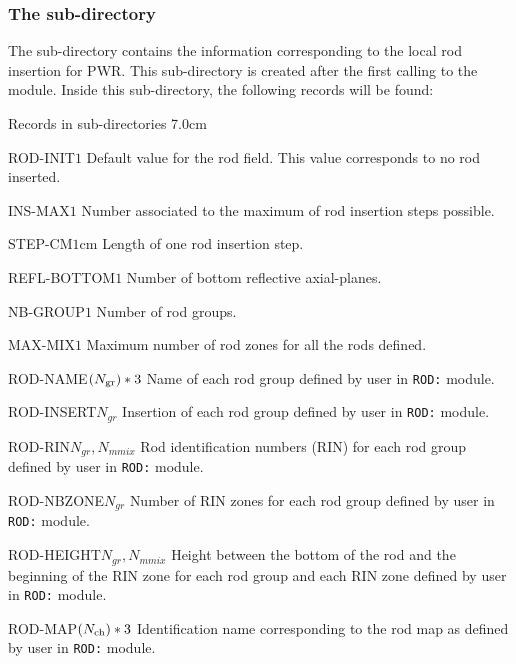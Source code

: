 \subsubsection{The  sub-directory}\label{sect:dirrodinfo}

The  sub-directory contains the information corresponding
to the local rod insertion for PWR. This sub-directory is created after the first calling to the  module. Inside this sub-directory,
the following records will be found:

\begin{DescriptionEnregistrement}{Records in  sub-directories}
{7.0cm} \label{tabl:tabrodinfo}

\RealEnr
 {ROD-INIT}{$1$}{} {Default value for the rod field. This value corresponds to no rod inserted.}

\IntEnr
 {INS-MAX}{$1$} {Number associated to the maximum of rod insertion steps possible.}

\RealEnr
 {STEP-CM}{$1$}{cm} {Length of one rod insertion step.}

\IntEnr
 {REFL-BOTTOM}{$1$} {Number of bottom reflective axial-planes.}

\IntEnr
 {NB-GROUP}{$1$} {Number of rod groups.}

\IntEnr
 {MAX-MIX}{$1$} {Maximum number of rod zones for all the rods defined.}

\OptCharEnr
 {ROD-NAME}{$(N_{\rm gr})*3$}{}
 {Name of each rod group defined by user in {\tt ROD:} module.}

\IntEnr
 {ROD-INSERT}{$N_{gr}$} {Insertion of each rod group defined by user in {\tt ROD:} module.}

\RealEnr
 {ROD-RIN}{$N_{gr}, N_{mmix}$}{} {Rod identification numbers (RIN) for each rod group defined by user in {\tt ROD:} module.}

\IntEnr
 {ROD-NBZONE}{$N_{gr}$} {Number of RIN zones for each rod group defined by user in {\tt ROD:} module.}

\RealEnr
 {ROD-HEIGHT}{$N_{gr}, N_{mmix}$}{}
 {Height between the bottom of the rod and the beginning of the RIN zone for each rod group and each RIN zone defined by user in {\tt ROD:} module.}

\OptCharEnr
 {ROD-MAP}{$(N_{\rm ch})*3$}{}
 {Identification name corresponding to the rod map as defined by user
 in {\tt ROD:} module.}

\end{DescriptionEnregistrement}

